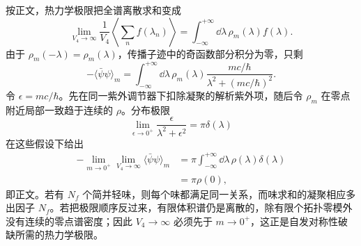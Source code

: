 \begin{derivation}
按正文，热力学极限把全谱离散求和变成
\begin{equation*}
 \lim_{V_4\to\infty}
 \frac1{V_4}\left\langle\sum_n f(\lambda_n)\right\rangle
 =\int_{-\infty}^{+\infty}\dd\lambda\,\rho_m(\lambda)f(\lambda).
\end{equation*}
由于 $\rho_m(-\lambda)=\rho_m(\lambda)$，传播子迹中的奇函数部分积分为零，只剩
\begin{equation*}
 -\langle\bar\psi\psi\rangle_m
 =\int_{-\infty}^{+\infty}\dd\lambda\,
 \rho_m(\lambda)
 \frac{mc/\hbar}{\lambda^2+(mc/\hbar)^2}.
\end{equation*}
令 $\epsilon=mc/\hbar$。先在同一紫外调节器下扣除凝聚的解析紫外项，随后令 $\rho_m$ 在零点附近局部一致趋于连续的 $\rho$。分布极限
\begin{equation*}
 \lim_{\epsilon\to0^+}
 \frac{\epsilon}{\lambda^2+\epsilon^2}
 =\pi\delta(\lambda)
\end{equation*}
在这些假设下给出
\begin{align*}
 -\lim_{m\to0^+}\lim_{V_4\to\infty}
 \langle\bar\psi\psi\rangle_m
 &=\pi\int_{-\infty}^{+\infty}\dd\lambda\,
 \rho(\lambda)\delta(\lambda)\\
 &=\pi\rho(0),
\end{align*}
即正文。若有 $N_f$ 个简并轻味，则每个味都满足同一关系，而味求和的凝聚相应多出因子 $N_f$。若把极限顺序反过来，有限体积谱仍是离散的，除有限个拓扑零模外没有连续的零点谱密度；因此 $V_4\to\infty$ 必须先于 $m\to0^+$，这正是自发对称性破缺所需的热力学极限。
\end{derivation}

